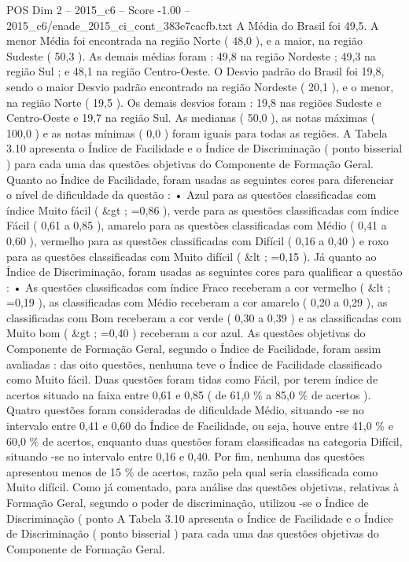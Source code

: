 \begin{textsample}{POS Dim 2 – 2015\_c6 – Score -1.00 – 2015\_c6/enade\_2015\_ci\_cont\_383e7cacfb.txt}
A Média do Brasil foi 49,5.
A menor Média foi encontrada na região Norte ( 48,0 ), e a maior, na região Sudeste ( 50,3 ).
As demais médias foram : 49,8 na região Nordeste ; 49,3 na região Sul ; e 48,1 na região Centro-Oeste.
O Desvio padrão do Brasil foi 19,8, sendo o maior Desvio padrão encontrado na região Nordeste ( 20,1 ), e o menor, na região Norte ( 19,5 ).
Os demais desvios foram : 19,8 nas regiões Sudeste e Centro-Oeste e 19,7 na região Sul.
As medianas ( 50,0 ), as notas máximas ( 100,0 ) e as notas mínimas ( 0,0 ) foram iguais para todas as regiões.
A Tabela 3.10 apresenta o Índice de Facilidade e o Índice de Discriminação ( ponto bisserial ) para cada uma das questões objetivas do Componente de Formação Geral.
Quanto ao Índice de Facilidade, foram usadas as seguintes cores para diferenciar o nível de dificuldade da questão : • Azul para as questões classificadas com índice Muito fácil ( \&gt ; =0,86 ), verde para as questões classificadas com índice Fácil ( 0,61 a 0,85 ), amarelo para as questões classificadas com Médio ( 0,41 a 0,60 ), vermelho para as questões classificadas com Difícil ( 0,16 a 0,40 ) e roxo para as questões classificadas com Muito difícil ( \&lt ; =0,15 ).
Já quanto ao Índice de Discriminação, foram usadas as seguintes cores para qualificar a questão : • As questões classificadas com índice Fraco receberam a cor vermelho ( \&lt ; =0,19 ), as classificadas com Médio receberam a cor amarelo ( 0,20 a 0,29 ), as classificadas com Bom receberam a cor verde ( 0,30 a 0,39 ) e as classificadas com Muito bom ( \&gt ; =0,40 ) receberam a cor azul.
As questões objetivas do Componente de Formação Geral, segundo o Índice de Facilidade, foram assim avaliadas : das oito questões, nenhuma teve o Índice de Facilidade classificado como Muito fácil.
Duas questões foram tidas como Fácil, por terem índice de acertos situado na faixa entre 0,61 e 0,85 ( de 61,0 \% a 85,0 \% de acertos ).
Quatro questões foram consideradas de dificuldade Médio, situando -se no intervalo entre 0,41 e 0,60 do Índice de Facilidade, ou seja, houve entre 41,0 \% e 60,0 \% de acertos, enquanto duas questões foram classificadas na categoria Difícil, situando -se no intervalo entre 0,16 e 0,40.
Por fim, nenhuma das questões apresentou menos de 15 \% de acertos, razão pela qual seria classificada como Muito difícil.
Como já comentado, para análise das questões objetivas, relativas à Formação Geral, segundo o poder de discriminação, utilizou -se o Índice de Discriminação ( ponto A Tabela 3.10 apresenta o Índice de Facilidade e o Índice de Discriminação ( ponto bisserial ) para cada uma das questões objetivas do Componente de Formação Geral.

\end{textsample}
